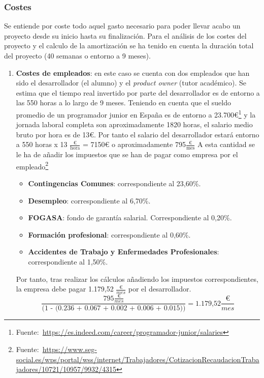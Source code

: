 \subsubsection{Costes}
Se entiende por coste todo aquel gasto necesario para poder llevar acabo un proyecto desde su inicio hasta su finalización. Para el análisis de los costes del proyecto y el calculo de la amortización se ha tenido en cuenta la duración total del proyecto (40 semanas o entorno a 9 meses).
\begin{enumerate}
\item \textbf{Costes de empleados}: en este caso se cuenta con dos empleados que han sido el desarrollador (el alumno) y el \textit{product owner} (tutor académico).
Se estima que el tiempo real invertido por parte del desarrollador es de entorno a las 550 horas a lo largo de 9 meses. Teniendo en cuenta que el sueldo promedio de un programador junior en España es de entorno a 23.700€\footnote{Fuente:~\url{https://es.indeed.com/career/programador-junior/salaries}} y la jornada laboral completa son aproximadamente 1820 horas, el salario medio bruto por hora es de 13€. Por tanto el salario del desarrollador estará entorno a 550 horas x 13 \(\frac{\text{€}}{\text{hora}}\) = 7150€ o aproximadamente 795\(\frac{\text{€}}{\text{mes}}\)
A esta cantidad se le ha de añadir los impuestos que se han de pagar como empresa por el empleado\footnote{Fuente:~\url{https://www.seg-social.es/wps/portal/wss/internet/Trabajadores/CotizacionRecaudacionTrabajadores/10721/10957/9932/4315}}
\begin{itemize}
\item \textbf{Contingencias Comunes}: correspondiente al 23,60\%.
\item \textbf{Desempleo}: correspondiente al 6,70\%.
\item \textbf{FOGASA}: fondo de garantía salarial. Correspondiente al 0,20\%.
\item \textbf{Formación profesional}: correspondiente al 0,60\%.
\item \textbf{Accidentes de Trabajo y Enfermedades Profesionales}: correspondiente al 1,50\%.
\end{itemize}
Por tanto, tras realizar los cálculos añadiendo los impuestos correspondientes, la empresa debe pagar 1.179,52 \(\frac{\text{€}}{mes}\) por el desarrollador.
\begin{equation}
\frac{795\frac{\text{€}}{mes}}{\text{(1 - (0.236 + 0.067 + 0.002 + 0.006 + 0.015))}} = \text{1.179,52} \frac{\text{€}}{mes}
\end{equation}


\end{enumerate}
